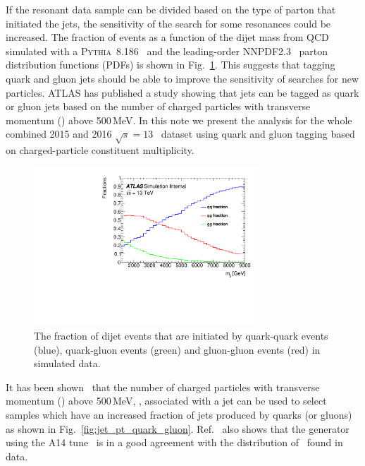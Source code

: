 If the resonant data sample can be divided based on the type of
parton that initiated the jets, the sensitivity of the search for some
resonances could be increased. 
The fraction of events as a function of  
the dijet mass from QCD  simulated with a  \textsc{Pythia~8.186}~\cite{pythia8} and the leading-order NNPDF2.3~\cite{Ball:2012cx} 
parton distribution functions (PDFs) is shown in Fig.~\ref{fig:quarkgluonfraction}. 
This suggests that tagging quark and gluon jets should be able to improve the sensitivity of searches for new particles. 
ATLAS has published a study \cite{ATL-PHYS-PUB-2017-009} showing that jets can be tagged as quark or gluon jets 
based on the number of charged particles with transverse momentum (\pt ) above 500\,MeV. 
In this note we present the analysis for the whole combined 2015 and
2016 $\sqrt{s} = 13$~\TeV\xspace dataset using quark 
and gluon tagging  based on charged-particle constituent multiplicity.


\begin{figure}[htb]
 \centering
\includegraphics[width=0.75\textwidth]{figures/tagging/Fractions_QCD.pdf}
\caption{The fraction of dijet events that are initiated by quark-quark events (blue), quark-gluon 
events (green) and gluon-gluon events (red) in simulated data.  \label{fig:quarkgluonfraction}}
\end{figure}

It has been shown~\cite{ATL-PHYS-PUB-2017-009}  that the number of charged particles with transverse
momentum (\pT ) above 500\,MeV, \ntrk, associated with a jet can be used
to select samples which have an increased fraction of jets produced by
quarks (or gluons) 
as shown in Fig.~\ref{fig:jet_pt_quark_gluon}.
Ref.~\cite{ATL-PHYS-PUB-2017-009} also shows that the 
generator~\cite{pythia8} using the A14 tune~\cite{A14tune} is in a good
agreement with the distribution of \ntrk\ found in data.


